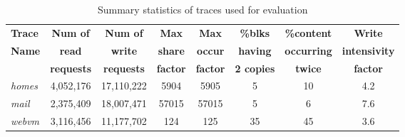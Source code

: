\begin{table}
\caption{Summary statistics of traces used for evaluation}
\label{tab:stat-summary}
\centering
\begin{tabular}{|l|c|c|c|c|c|c|c|} \hline
	\textbf{Trace} & \textbf{Num of} & \textbf{Num of} & \textbf{Max} & \textbf{Max} & \textbf{\%blks} & \textbf{\%content} & \textbf{Write} \\
	 \textbf{Name} & \textbf{read} & \textbf{write} & \textbf{share} & \textbf{occur} & \textbf{having} & \textbf{occurring} & \textbf{intensivity} \\
			   \textbf{} & \textbf{requests} & \textbf{requests} & \textbf{factor} & \textbf{factor} & \textbf{2 copies} & \textbf{twice} & \textbf{factor}  \\ \hline
	\textit{homes} & 4,052,176 & 17,110,222 & 5904 & 5905 & 5 & 10 & 4.2 \\ \hline
	 \textit{mail} & 2,375,409 & 18,007,471 & 57015 & 57015 & 5 & 6 & 7.6 \\ \hline
	\textit{webvm} & 3,116,456 & 11,177,702 & 124 & 125 & 35 & 45 & 3.6 \\ \hline
\end{tabular}
\end{table}

